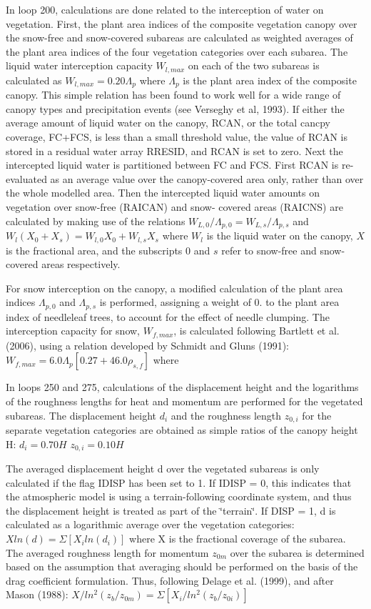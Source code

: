 In loop 200, calculations are done related to the interception of water on vegetation. First, the plant area indices of the composite vegetation canopy over the snow-\/free and snow-\/covered subareas are calculated as weighted averages of the plant area indices of the four vegetation categories over each subarea. The liquid water interception capacity $W_{l,max}$ on each of the two subareas is calculated as $W_{l,max} = 0.20 \Lambda_p$ where $\Lambda_p$ is the plant area index of the composite canopy. This simple relation has been found to work well for a wide range of canopy types and precipitation events (see Verseghy et al, 1993). If either the average amount of liquid water on the canopy, R\+C\+A\+N, or the total cancpy coverage, F\+C+\+F\+C\+S, is less than a small threshold value, the value of R\+C\+A\+N is stored in a residual water array R\+R\+E\+S\+I\+D, and R\+C\+A\+N is set to zero. Next the intercepted liquid water is partitioned between F\+C and F\+C\+S. First R\+C\+A\+N is re-\/ evaluated as an average value over the canopy-\/covered area only, rather than over the whole modelled area. Then the intercepted liquid water amounts on vegetation over snow-\/free (R\+A\+I\+C\+A\+N) and snow-\/ covered areas (R\+A\+I\+C\+N\+S) are calculated by making use of the relations $W_{L,0} / \Lambda_{p,0} = W_{L,s} / \Lambda_{p,s}$ and $W_l (X_0 + X_s) = W_{l,0} X_0 + W_{l,s} X_s$ where $W_l$ is the liquid water on the canopy, $X$ is the fractional area, and the subscripts $0$ and $s$ refer to snow-\/free and snow-\/covered areas respectively.

For snow interception on the canopy, a modified calculation of the plant area indices $\Lambda_{p,0}$ and $\Lambda_{p,s}$ is performed, assigning a weight of 0. to the plant area index of needleleaf trees, to account for the effect of needle clumping. The interception capacity for snow, $W_{f,max}$, is calculated following Bartlett et al. (2006), using a relation developed by Schmidt and Gluns (1991)\+: $W_{f,max} = 6.0 \Lambda_p [0.27 + 46.0 \rho_{s,f} ]$ where

In loops 250 and 275, calculations of the displacement height and the logarithms of the roughness lengths for heat and momentum are performed for the vegetated subareas. The displacement height $d_i$ and the roughness length $z_{0,i}$ for the separate vegetation categories are obtained as simple ratios of the canopy height H\+: $d_i = 0.70 H$ $z_{0,i} = 0.10 H$

The averaged displacement height d over the vegetated subareas is only calculated if the flag I\+D\+I\+S\+P has been set to 1. If I\+D\+I\+S\+P = 0, this indicates that the atmospheric model is using a terrain-\/following coordinate system, and thus the displacement height is treated as part of the \char`\"{}terrain\char`\"{}. If D\+I\+S\+P = 1, d is calculated as a logarithmic average over the vegetation categories\+: $X ln(d) = \Sigma [X_i ln(d_i)]$ where X is the fractional coverage of the subarea. The averaged roughness length for momentum $z_{0m}$ over the subarea is determined based on the assumption that averaging should be performed on the basis of the drag coefficient formulation. Thus, following Delage et al. (1999), and after Mason (1988)\+: $X/ln^2 (z_b /z_{0m}) = \Sigma [X_i /ln^2 (z_b /z_{0i})]$

